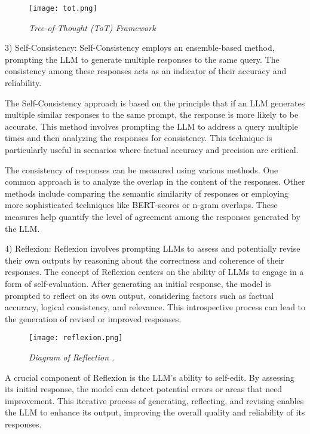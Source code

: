 \begin{figure}[H]
    \centering
    \texttt{[image: tot.png]}
    \caption{
        \it{Tree-of-Thought (ToT) Framework \cite{yao2023tree}}
    }
\end{figure}

\hfill

3) Self-Consistency: Self-Consistency \cite{manakul2023selfcheckgpt} employs an ensemble-based method, prompting the LLM to generate multiple responses to the same query. The consistency among these responses acts as an indicator of their accuracy and reliability.

The Self-Consistency approach is based on the principle that if an LLM generates multiple similar responses to the same prompt, the response is more likely to be accurate. This method involves prompting the LLM to address a query multiple times and then analyzing the responses for consistency. This technique is particularly useful in scenarios where factual accuracy and precision are critical.

The consistency of responses can be measured using various methods. One common approach is to analyze the overlap in the content of the responses. Other methods include comparing the semantic similarity of responses or employing more sophisticated techniques like BERT-scores or n-gram overlaps. These measures help quantify the level of agreement among the responses generated by the LLM.

\hfill

4) Reflexion: Reflexion \cite{shinn2023reflexion} involves prompting LLMs to assess and potentially revise their own outputs by reasoning about the correctness and coherence of their responses. The concept of Reflexion centers on the ability of LLMs to engage in a form of self-evaluation. After generating an initial response, the model is prompted to reflect on its own output, considering factors such as factual accuracy, logical consistency, and relevance. This introspective process can lead to the generation of revised or improved responses.

\begin{figure}[H]
    \centering
    \texttt{[image: reflexion.png]}
    \caption{
        \it{Diagram of Reflection \cite{shinn2023reflexion}.}
    }
\end{figure}

A crucial component of Reflexion is the LLM's ability to self-edit. By assessing its initial response, the model can detect potential errors or areas that need improvement. This iterative process of generating, reflecting, and revising enables the LLM to enhance its output, improving the overall quality and reliability of its responses.

